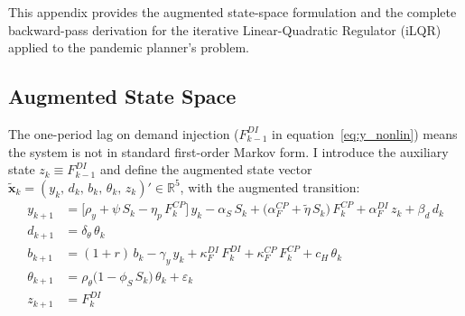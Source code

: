 \documentclass[12pt, a4paper]{article}
\begin{document}
This appendix provides the augmented state-space formulation and the complete
backward-pass derivation for the iterative Linear-Quadratic Regulator (iLQR) applied
to the pandemic planner's problem.

\subsection{Augmented State Space}
\label{app:augmented}

The one-period lag on demand injection ($F_{k-1}^{DI}$ in
equation~\ref{eq:y_nonlin}) means the system is not in standard first-order Markov
form. I introduce the auxiliary state $z_k \equiv F_{k-1}^{DI}$ and define the
augmented state vector
$\tilde{\bm{x}}_k = (y_k,\, d_k,\, b_k,\, \theta_k,\, z_k)' \in \mathbb{R}^5$,
with the augmented transition:
%
\begin{align}
    y_{k+1}      &= \bigl[\rho_y + \psi\, S_k - \eta_p\, F_k^{CP}\bigr]\, y_k
                    - \alpha_S\, S_k
                    + \bigl(\alpha_F^{CP} + \tilde{\eta}\, S_k\bigr)\, F_k^{CP}
                    + \alpha_F^{DI}\, z_k
                    + \beta_d\, d_k
    \label{eq:y_aug} \\[1ex]
    d_{k+1}      &= \delta_\theta\, \theta_k
    \label{eq:d_aug} \\[1ex]
    b_{k+1}      &= (1+r)\, b_k - \gamma_y\, y_k
                    + \kappa_F^{DI}\, F_k^{DI} + \kappa_F^{CP}\, F_k^{CP}
                    + c_H\, \theta_k
    \label{eq:b_aug} \\[1ex]
    \theta_{k+1} &= \rho_\theta\bigl(1 - \phi_S\, S_k\bigr)\, \theta_k
                    + \varepsilon_k
    \label{eq:theta_aug} \\[1ex]
    z_{k+1}      &= F_k^{DI}
    \label{eq:z_aug}
\end{align}
\end{document}

